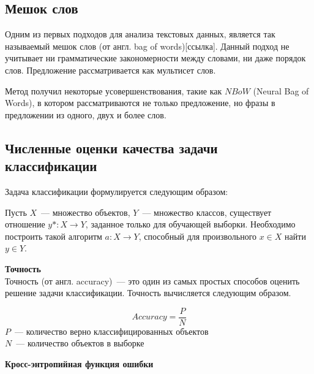 
\subsection{Мешок слов}

Одним из первых подходов для анализа текстовых данных, 
является так называемый мешок слов (от англ. bag of words)[ссылка].
Данный подход не учитывает ни грамматические закономерности между словами, ни даже порядок слов.
Предложение рассматривается как мультисет слов.

Метод получил некоторые усовершенствования, такие как $NBoW$ (Neural Bag of Words), 
в котором рассматриваются не только предложение, но фразы в предложении из одного, двух и более слов\cite{DBLP:journals/corr/KalchbrennerGB14}.






\subsection{Численные оценки качества задачи классификации}

Задача классификации формулируется следующим образом:

Пусть $X$~--- множество объектов, $Y$~--- множество классов,
существует отношение $y* : X \rightarrow Y$, заданное только для обучающей выборки.
Необходимо построить такой алгоритм $a: X \rightarrow Y$, способный для произвольного
$x \in X$ найти $y \in Y$.	

\textbf{Точность}\\
Точность (от англ. accuracy)~--- это один из самых простых способов оценить
решение задачи классификации. Точность вычисляется следующим образом.

$$Accuracy =\frac{P}{N}$$
$P$~--- количество верно классифицированных объектов\\
$N$~--- количество объектов в выборке

\textbf{Кросс-энтропийная функция ошибки}\\